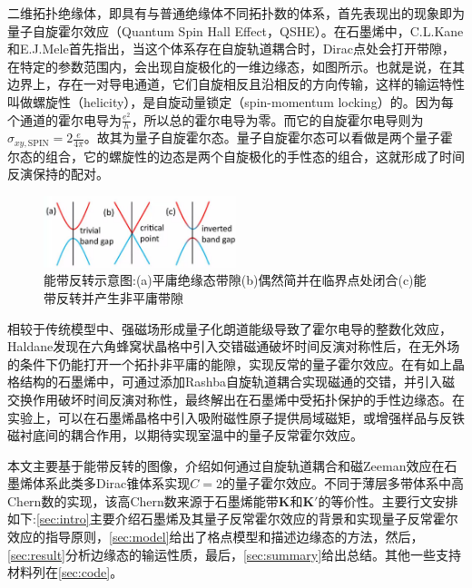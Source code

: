     二维拓扑绝缘体，即具有与普通绝缘体不同拓扑数的体系，首先表现出的现象即为量子自旋霍尔效应（Quantum Spin Hall Effect，QSHE）。在石墨烯中，C.L.Kane和E.J.Mele首先指出，当这个体系存在自旋轨道耦合时，Dirac点处会打开带隙，在特定的参数范围内，会出现自旋极化的一维边缘态，如图所示。也就是说，在其边界上，存在一对导电通道，它们自旋相反且沿相反的方向传输，这样的输运特性叫做螺旋性（helicity），是自旋动量锁定（spin-momentum locking）的。因为每个通道的霍尔电导为$\frac{e^2}{h}$，所以总的霍尔电导为零。而它的自旋霍尔电导则为$\sigma_{xy,\text{SPIN}}=2\frac{e}{4\pi}$。故其为量子自旋霍尔态。量子自旋霍尔态可以看做是两个量子霍尔态的组合，它的螺旋性的边态是两个自旋极化的手性态的组合，这就形成了时间反演保持的配对\cite{Qi2011}。

    \begin{figure}
      \centering
      \includegraphics[width=0.5\textwidth]{pic/fig0_2.jpg}
      \caption{能带反转示意图:(a)平庸绝缘态带隙(b)偶然简并在临界点处闭合(c)能带反转并产生非平庸带隙\cite{Bansil2016}}\label{fig:BI}
    \end{figure}

    相较于传统模型中、强磁场形成量子化朗道能级导致了霍尔电导的整数化效应，Haldane\cite{Haldane1988}发现在六角蜂窝状晶格中引入交错磁通破坏时间反演对称性后，在无外场的条件下仍能打开一个拓扑非平庸的能隙，实现反常的量子霍尔效应。在有如上晶格结构的石墨烯中，可通过添加Rashba自旋轨道耦合实现磁通的交错，并引入磁交换作用破坏时间反演对称性，最终解出在石墨烯中受拓扑保护的手性边缘态。在实验上，可以在石墨烯晶格中引入吸附磁性原子提供局域磁矩，或增强样品与反铁磁衬底间的耦合作用，以期待实现室温中的量子反常霍尔效应。

    本文主要基于能带反转的图像，介绍如何通过自旋轨道耦合和磁Zeeman效应在石墨烯体系此类多Dirac锥体系实现$C=2$的量子霍尔效应。不同于薄层多带体系中高Chern数的实现\cite{Jiang2012,WangJ2013}，该高Chern数来源于石墨烯能带$\mathbf{K}$和$\mathbf{K}'$的等价性。主要行文安排如下:\ref{sec:intro}主要介绍石墨烯及其量子反常霍尔效应的背景和实现量子反常霍尔效应的指导原则，\ref{sec:model}给出了格点模型和描述边缘态的方法，然后，\ref{sec:result}分析边缘态的输运性质，最后，\ref{sec:summary}给出总结。其他一些支持材料列在\ref{sec:code}。

